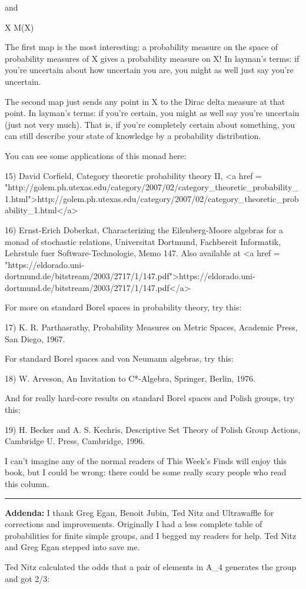 and 

X \to  M(X)

The first map is the most interesting: a probability measure
on the space of probability measures of X gives a probability
measure on X!  In layman's terms: if you're uncertain about
how uncertain you are, you might as well just say you're uncertain.

The second map just sends any point in X to the Dirac delta measure at
that point.  In layman's terms: if you're certain, you might as well
say you're uncertain (just not very much).  That is, if you're
completely certain about something, you can still describe your state
of knowledge by a probability distribution.

You can see some applications of this monad here:

15) David Corfield, Category theoretic probability theory II,
<a href = "http://golem.ph.utexas.edu/category/2007/02/category_theoretic_probability_1.html">http://golem.ph.utexas.edu/category/2007/02/category_theoretic_probability_1.html</a>

16) Ernst-Erich Doberkat, Characterizing the Eilenberg-Moore 
algebras for a monad of stochastic relations, Universitat 
Dortmund, Fachbereit Informatik, Lehrstule fuer Software-Technologie,
Memo 147.  Also available at 
<a href = "https://eldorado.uni-dortmund.de/bitstream/2003/2717/1/147.pdf">https://eldorado.uni-dortmund.de/bitstream/2003/2717/1/147.pdf</a>

For more on standard Borel spaces in probability theory, try this:

17) K. R. Parthasrathy, Probability Measures on Metric Spaces, 
Academic Press, San Diego, 1967.

For standard Borel spaces and von Neumann algebras, try this:

18) W. Arveson, An Invitation to C*-Algebra, Springer, Berlin, 1976.

And for really hard-core results on standard Borel spaces and 
Polish groups, try this:

19) H. Becker and A. S. Kechris, Descriptive Set Theory of Polish 
Group Actions, Cambridge U. Press, Cambridge, 1996.

I can't imagine any of the normal readers of This Week's Finds 
will enjoy this book, but I could be wrong: there could be some
really scary people who read this column.

\par\noindent\rule{\textwidth}{0.4pt}
\textbf{Addenda:} I thank Greg Egan, Benoit Jubin,
Ted Nitz and Ultrawaffle for corrections 
and improvements.   Originally I had a less complete table of 
probabilities for finite simple groups, and I begged my readers for 
help.  Ted Nitz and Greg Egan stepped into save me.

Ted Nitz calculated the odds that a pair of elements in 
A_{4} generates the group and got 2/3:



